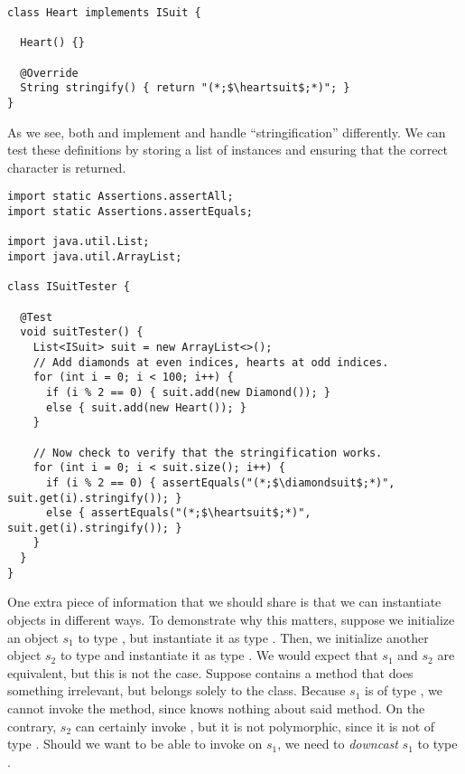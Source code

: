 \begin{lstlisting}[language=MyJava]
class Heart implements ISuit {
    
  Heart() {}

  @Override
  String stringify() { return "(*;$\heartsuit$;*)"; }
}
\end{lstlisting}

As we see, both  and  implement  and handle ``stringification'' differently. We can test these definitions by storing a list of  instances and ensuring that the correct character is returned.

\begin{lstlisting}[language=MyJava]
import static Assertions.assertAll;
import static Assertions.assertEquals;

import java.util.List;
import java.util.ArrayList;

class ISuitTester {

  @Test
  void suitTester() {
    List<ISuit> suit = new ArrayList<>();
    // Add diamonds at even indices, hearts at odd indices.
    for (int i = 0; i < 100; i++) {
      if (i % 2 == 0) { suit.add(new Diamond()); }
      else { suit.add(new Heart()); }
    }

    // Now check to verify that the stringification works.
    for (int i = 0; i < suit.size(); i++) {
      if (i % 2 == 0) { assertEquals("(*;$\diamondsuit$;*)", suit.get(i).stringify()); }
      else { assertEquals("(*;$\heartsuit$;*)", suit.get(i).stringify()); }
    }
  }
}
\end{lstlisting}

One extra piece of information that we should share is that we can instantiate objects in different ways. To demonstrate why this matters, suppose we initialize an object $s_1$ to type , but instantiate it as type . Then, we initialize another object $s_2$ to type  and instantiate it as type . We would expect that $s_1$ and $s_2$ are equivalent, but this is not the case. Suppose  contains a method  that does something irrelevant, but belongs solely to the  class. Because $s_1$ is of type , we cannot invoke the  method, since  knows nothing about said method. On the contrary, $s_2$ can certainly invoke , but it is not polymorphic, since it is not of type . Should we want to be able to invoke  on $s_1$, we need to \emph{downcast} $s_1$ to type .

